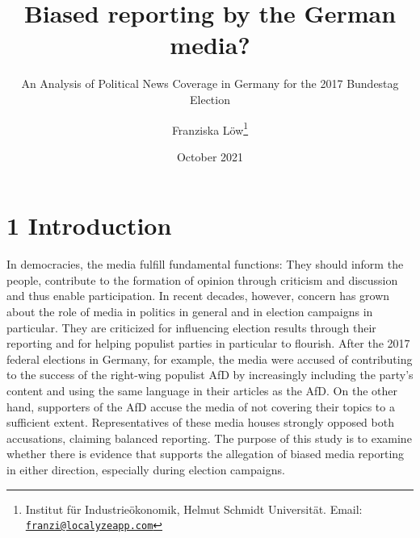 \documentclass[
  12pt,
]{article}
\title{Biased reporting by the German media?}
\subtitle{An Analysis of Political News Coverage in Germany for the 2017
Bundestag Election}
\author{Franziska Löw\footnote{Institut für Industrieökonomik, Helmut
  Schmidt Universität. Email:
  \href{mailto:franzi@localyzeapp.com}{\nolinkurl{franzi@localyzeapp.com}}}}
\date{October 2021}
\begin{document}
\maketitle

\pagebreak
\tableofcontents
\pagebreak

\listoftables
\pagebreak

\listoffigures
\pagebreak

\hypertarget{introduction}{%
\section{1 Introduction}\label{introduction}}

In democracies, the media fulfill fundamental functions: They should
inform the people, contribute to the formation of opinion through
criticism and discussion and thus enable participation. In recent
decades, however, concern has grown about the role of media in politics
in general and in election campaigns in particular. They are criticized
for influencing election results through their reporting and for helping
populist parties in particular to flourish. After the 2017 federal
elections in Germany, for example, the media were accused of
contributing to the success of the right-wing populist AfD by
increasingly including the party's content and using the same language
in their articles as the AfD. On the other hand, supporters of the AfD
accuse the media of not covering their topics to a sufficient extent.
Representatives of these media houses strongly opposed both accusations,
claiming balanced reporting. The purpose of this study is to examine
whether there is evidence that supports the allegation of biased media
reporting in either direction, especially during election campaigns.
\end{document}
